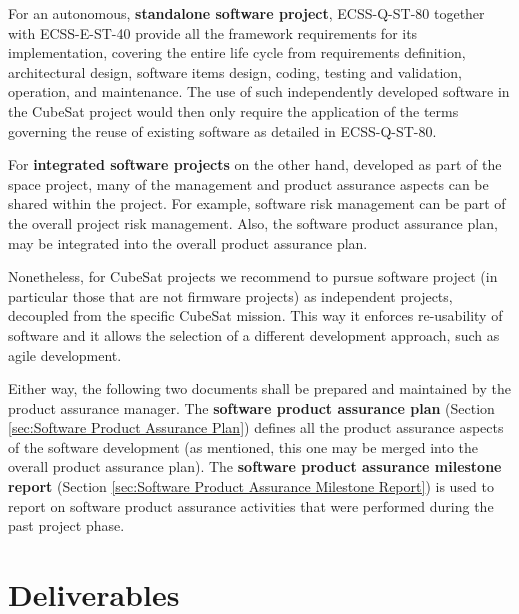 For an autonomous, \textbf{standalone software project}, ECSS-Q-ST-80 together with ECSS-E-ST-40 \cite{ECSS-E-ST-40} provide all the framework requirements for its implementation, covering the entire life cycle from requirements definition, architectural design, software items design, coding, testing and validation, operation, and maintenance. The use of such independently developed software in the CubeSat project would then only require the application of the terms governing the reuse of existing software as detailed in ECSS-Q-ST-80.

For \textbf{integrated software projects} on the other hand, developed as part of the space project, many of the management and product assurance aspects can be shared within the project. For example, software risk management can be part of the overall project risk management. Also, the software product assurance plan, may be integrated into the overall product assurance plan. 

Nonetheless, for CubeSat projects we recommend to pursue software project (in particular those that are not firmware projects) as independent projects, decoupled from the specific CubeSat mission. This way it enforces re-usability of software and it allows the selection of a different development approach, such as agile development. 

Either way, the following two documents shall be prepared and maintained by the product assurance manager. The \textbf{software product assurance plan} (Section \ref{sec:Software Product Assurance Plan}) defines all the product assurance aspects of the software development (as mentioned, this one may be merged into the overall product assurance plan). The \textbf{software product assurance milestone report} (Section \ref{sec:Software Product Assurance Milestone Report}) is used to report on software product assurance activities that were performed during the past project phase.

\clearpage
\section{Deliverables}
\label{sec:Product Assurance Deliverables}

